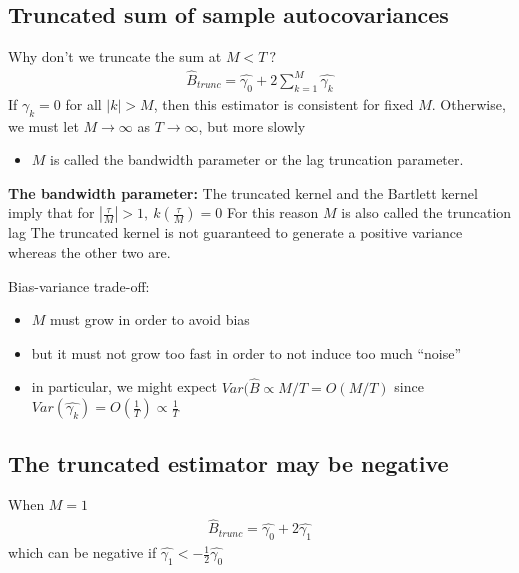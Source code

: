 \documentclass[a4paper,twoside,11pt]{article}
\begin{document}
\subsection{Truncated sum of sample autocovariances}
Why don't we truncate the sum at $M<T \ ?$ 
\begin{equation*}
\begin{aligned}
\hat{B}_{trunc} = \hat{\gamma_0} + 2 \sum^M_{k=1} \hat{\gamma_k}
\end{aligned}
\end{equation*}
If $\gamma_k = 0$ for all $|k|>M$, then this estimator is consistent for fixed $M$. 
\newline
Otherwise, we must let $M \rightarrow \infty$ as $T \rightarrow \infty$, but more slowly
\begin{itemize}
    \item $M$ is called the bandwidth parameter or the lag truncation parameter.
\end{itemize}
\begin{shaded*}
\noindent \textbf{The bandwidth parameter:}
\newline
\newline
The truncated kernel and the Bartlett kernel imply that for $| \frac{\tau}{M}|>1, \ k(\frac{\tau}{M})=0$
\newline
For this reason $M$ is also called the truncation lag
\newline
The truncated kernel is not guaranteed to generate a positive variance whereas the other two are.
\end{shaded*}
Bias-variance trade-off:
\begin{itemize}
    \item $M$ must grow in order to avoid bias
    \item but it must not grow too fast in order to not induce too much “noise”
    \item in particular, we might expect $Var (\hat{B} \propto M/T = O(M/T)$ since $Var(\hat{\gamma_k}) = O(\frac{1}{T}) \propto \frac{1}{T}$
\end{itemize}
\subsection{The truncated estimator may be negative}
When $M=1$
\begin{equation*}
\begin{aligned}
\hat{B}_{trunc} = \hat{\gamma_0} + 2  \hat{\gamma_1}
\end{aligned}
\end{equation*}
which can be negative if $\hat{\gamma_1} < - \frac{1}{2}\hat{\gamma_0}$
\end{document}
